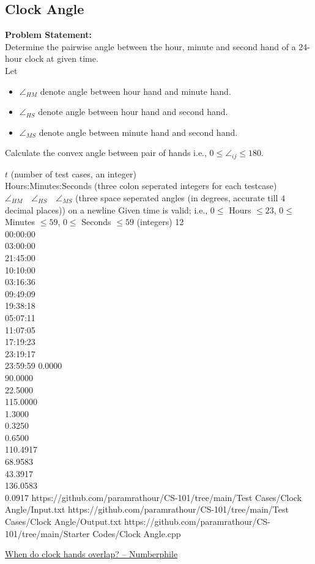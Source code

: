 \documentclass[../../Problems]{subfiles}
\begin{document}
\subsection{Clock Angle}
\textbf{Problem Statement:}\\
Determine the pairwise angle between the hour, minute and second hand of a 24-hour clock at given time.
\\Let
\begin{itemize}
\item $\angle_{HM}$ denote angle between hour hand and minute hand.
\item $\angle_{HS}$ denote angle between hour hand and second hand.
\item $\angle_{MS}$ denote angle between minute hand and second hand.
\end{itemize}
\begin{note}
Calculate the convex angle between pair of hands i.e., $0\leq\angle_{ij}\leq180$.
\end{note}
\begin{testcasesMore}
	{$t$ \hfill(number of test cases, an integer)\\
	Hours:Minutes:Seconds \hfill(three colon seperated integers for each testcase)}
	{$\angle_{HM}\quad\angle_{HS}\quad\angle_{MS}$ \hfill{(three space seperated angles (in degrees, accurate till $4$ decimal places)) on a newline}}
	{Given time is valid; i.e., $0 \leq$ Hours $\leq 23$, $0 \leq$ Minutes $\leq 59$, $0 \leq$ Seconds $\leq 59$ \hfill(integers)}
	{12\\00:00:00\\03:00:00\\21:45:00\\10:10:00\\03:16:36\\09:49:09\\19:38:18\\05:07:11\\11:07:05\\17:19:23\\23:19:17\\23:59:59}
	{0.0000\\90.0000\\22.5000\\115.0000\\1.3000\\0.3250\\0.6500\\110.4917\\68.9583\\43.3917\\136.0583\\0.0917}
	{https://github.com/paramrathour/CS-101/tree/main/Test Cases/Clock Angle/Input.txt}
	{https://github.com/paramrathour/CS-101/tree/main/Test Cases/Clock Angle/Output.txt}
	{https://github.com/paramrathour/CS-101/tree/main/Starter Codes/Clock Angle.cpp}
\end{testcasesMore}
\begin{funvideo}
\href{https://youtu.be/HcqdqsQq-6M}{When do clock hands overlap? -- Numberphile}
\end{funvideo}
\end{document}
